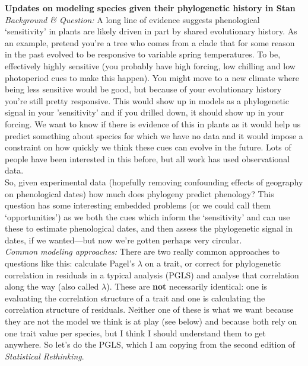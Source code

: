 \documentclass[11pt,letter]{article}
\begin{document}

\renewcommand{\refname}{\CHead{}}

{\bf Updates on modeling species given their phylogenetic history in Stan}\\

\emph{Background \& Question:} A long line of evidence suggests phenological `sensitivity' in plants are likely driven in part by shared evolutionary history. As an example, pretend you're a tree who comes from a clade that for some reason in the past evolved to be responsive to variable spring temperatures. To be, effectively highly sensitive (you probably have high forcing, low chilling and low photoperiod cues to make this happen). You might move to a new climate where being less sensitive would be good, but because of your evolutionary history you're still pretty responsive. This would show up in models as a phylogenetic signal in your 'sensitivity' and if you drilled down, it should show up in your forcing. We want to know if there is evidence of this in plants as it would help us predict something about species for which we have no data and it would impose a constraint on how quickly we think these cues can evolve in the future. Lots of people have been interested in this before, but all work has used observational data. \\

So, given experimental data (hopefully removing confounding effects of geography on phenological dates) how much does phylogeny predict phenology? This question has some interesting embedded problems (or we could call them `opportunities') as we both the cues which inform the `sensitivity' and can use these to estimate phenological dates, and then assess the phylogenetic signal in dates, if we wanted---but now we're gotten perhaps very circular.\\

\emph{Common modeling approaches:} There are two really common approaches to questions like this: calculate Pagel's $\lambda$ on a trait, or correct for phylogenetic correlation in residuals in a typical analysis (PGLS) and analyse that correlation along the way (also called $\lambda$). These are {\bf not} necessarily identical: one is evaluating the correlation structure of a trait and one is calculating the correlation structure of residuals. Neither one of these is what we want because they are not the model we think is at play (see below) and because both rely on one trait value per species, but I think I should understand them to get anywhere. So let's do the PGLS, which I am copying from the second edition of \emph{Statistical Rethinking}.\\
\end{document}
